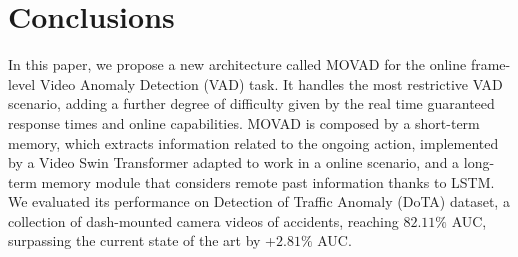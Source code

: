 \section{Conclusions}
\label{sec:conclusions}

In this paper, we propose a new architecture called MOVAD for the online frame-level Video Anomaly Detection (VAD) task.
It handles the most restrictive VAD scenario, adding a further degree of difficulty given by the real time guaranteed response times and online capabilities.
MOVAD is composed by a short-term memory, which extracts information related to the ongoing action, implemented by a Video Swin Transformer adapted to work in a online scenario, and a long-term memory module that considers remote past information thanks to LSTM.
We evaluated its performance on Detection of Traffic Anomaly (DoTA) dataset, a collection of dash-mounted camera videos of accidents, reaching $82.11\%$ AUC, surpassing the current state of the art by +$2.81\%$ AUC.
